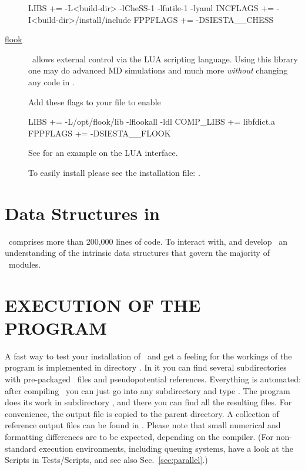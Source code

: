 \begin{description}
\begin{shellexample}
  LIBS += -L<build-dir> -lCheSS-1 -lfutile-1 -lyaml
  INCFLAGS += -I<build-dir>/install/include
  FPPFLAGS += -DSIESTA__CHESS
\end{shellexample}

  
  \item[\href{https://github.com/electronicstructurelibrary/flook}{flook}]%
  \siesta\ allows external control via the LUA scripting language.
  Using this library one may do advanced MD simulations and much more
  \emph{without} changing any code in \siesta.
  
  Add these flags to your  file to enable 
\begin{shellexample}
  LIBS += -L/opt/flook/lib -lflookall -ldl
  COMP_LIBS += libfdict.a
  FPPFLAGS += -DSIESTA__FLOOK
\end{shellexample}
  
  See  for an example on the LUA interface.

  To easily install  please see the installation file:
  .

\end{description}


\ifdeveloper
\section{Data Structures in \texorpdfstring{\siesta}{siesta}}

\siesta\ comprises more than 200,000 lines of code. To interact with,
and develop \siesta\ an understanding of the intrinsic data structures
that govern the majority of \siesta\ modules.

\fi


\section{EXECUTION OF THE PROGRAM}

A fast way to test your installation of \siesta\ and get a feeling for
the workings of the program is implemented in directory
. In it you can find several subdirectories
with pre-packaged \fdflib\ files and pseudopotential references. Everything
is automated: after compiling \siesta\ you can just go into any
subdirectory and type . The program does its work in
subdirectory , and there you can find all the resulting
files. For convenience, the output file is copied to the parent
directory. A collection of reference output files can be found in
. Please note that small numerical and
formatting differences are to be expected, depending on the compiler.
(For non-standard execution environments, including queuing systems,
have a look at the Scripts in Tests/Scripts, and see also
Sec.~\ref{sec:parallel}.)

